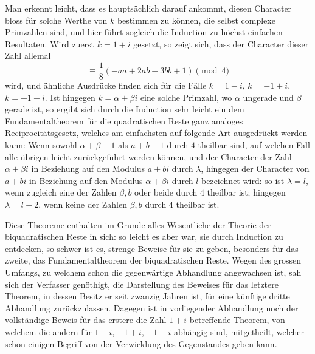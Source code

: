 \documentclass[12pt]{article}
\begin{document}
Man erkennt leicht, dass es hauptsächlich darauf ankommt, diesen Character bloss für solche Werthe von $k$ bestimmen zu können, die selbst complexe Primzahlen sind, und hier führt sogleich die Induction zu höchst einfachen Resultaten. Wird zuerst $k=1+i$ gesetzt, so zeigt sich, dass der Character dieser Zahl allemal
\[
\equiv \frac18(-aa+2ab-3bb+1)\pmod 4
\]
wird, und ähnliche Ausdrücke finden sich für die Fälle $k=1-i$, $k=-1+i$, $k=-1-i$. Ist hingegen $k=\alpha+\beta i$ eine solche Primzahl, wo $\alpha$ ungerade und $\beta$ gerade ist, so ergibt sich durch die Induction sehr leicht ein dem Fundamentaltheorem für die quadratischen Reste ganz analoges Reciprocitätsgesetz, welches am einfachsten auf folgende Art ausgedrückt werden kann: Wenn sowohl $\alpha+\beta-1$ als $a+b-1$ durch $4$ theilbar sind, auf welchen Fall alle übrigen leicht zurückgeführt werden können, und der Character der Zahl $\alpha+\beta i$ in Beziehung auf den Modulus $a+bi$ durch $\lambda$, hingegen der Character von $a+bi$ in Beziehung auf den Modulus $\alpha+\beta i$ durch $l$ bezeichnet wird: so ist $\lambda=l$, wenn zugleich eine der Zahlen $\beta,b$ oder beide durch $4$ theilbar ist; hingegen $\lambda=l+2$, wenn keine der Zahlen $\beta,b$ durch $4$ theilbar ist.

Diese Theoreme enthalten im Grunde alles Wesentliche der Theorie der biquadratischen Reste in sich: so leicht es aber war, sie durch Induction zu entdecken, so schwer ist es, strenge Beweise für sie zu geben, besonders für das zweite, das Fundamentaltheorem der biquadratischen Reste. Wegen des grossen Umfangs, zu welchem schon die gegenwärtige Abhandlung angewachsen ist, sah sich der Verfasser genöthigt, die Darstellung des Beweises für das letztere Theorem, in dessen Besitz er seit zwanzig Jahren ist, für eine künftige dritte Abhandlung zurückzulassen. Dagegen ist in vorliegender Abhandlung noch der vollständige Beweis für das erstere die Zahl $1+i$ betreffende Theorem, von welchem die andern für $1-i$, $-1+i$, $-1-i$ abhängig sind, mitgetheilt, welcher schon einigen Begriff von der Verwicklung des Gegenstandes geben kann.
\end{document}
